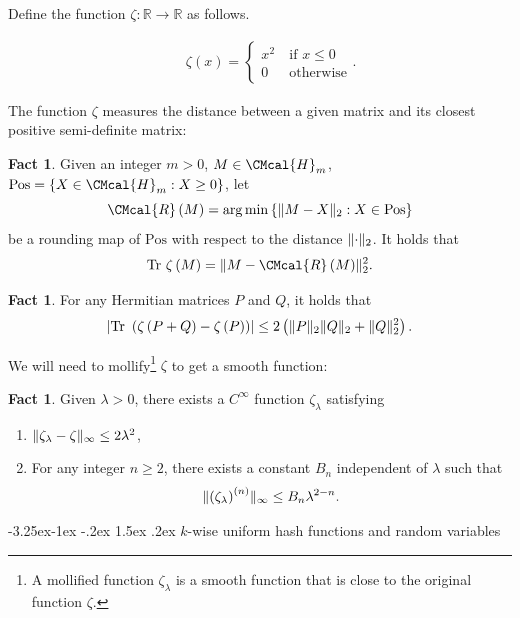 \documentclass[11pt]{article}
\makeatletter
\renewcommand{\subsection}{\@startsection{subsection}{2}{\z@}%
             {-3.25ex\@plus -1ex \@minus -.2ex}%
             {1.5ex \@plus .2ex}%
             {\normalfont\large\scshape\bfseries}}
\def\H{\CMcal{H}}
\def\R{\CMcal{R}}
\theoremstyle{plain}
\theoremstyle{definition}
\newtheorem{fact}[theorem]{Fact}
\newcommand{\reals}{{\mathbb R}}
\newcommand {\set} [1] {\ensuremath{ \left\lbrace #1 \right\rbrace }}
\newcommand {\br} [1] {\ensuremath{ \left( #1 \right) }}
\DeclarePairedDelimiter{\norm}{\lVert}{\rVert}
\newcommand {\normsub} [2] {\ensuremath{ \norm{#1}_{#2} }}
\newcommand {\twonorm} [1] {\normsub{#1}{2}}
\DeclarePairedDelimiter{\abs}{\lvert}{\rvert}
\newcommand {\Tr} {\ensuremath{ \mathrm{Tr} }}
\newcommand{\1}{\mathbb{1}} %
\makeatother
\begin{document}
Define the function $\zeta:\reals\rightarrow\reals$ as follows.

\begin{eqnarray}
	&&\zeta\br{x}=\begin{cases}x^2~&\mbox{if $x\leq 0$}\\ 0~&\mbox{otherwise}\end{cases}.\label{eqn:zeta}
\end{eqnarray}

The function $\zeta$ measures the distance between a given matrix and its closest positive semi-definite matrix:
\begin{fact}\label{lem:closedelta1}\cite[Lemma 9.1]{qin2021nonlocal}
	Given an integer $m>0$, $M\in\H_m$, $\mathrm{Pos}=\set{X\in\H_m:X\geq0}$, let \[\R\br{M}=\arg\min\set{\twonorm{M-X}:X\in\mathrm{Pos}}\]
	 be a rounding map of $\mathrm{Pos}$ with respect to the distance $\twonorm{\cdot}$. It holds that
	\[\Tr~\zeta\br{M}=\twonorm{M-\R\br{M}}^2.\]
\end{fact}

\begin{fact}\label{lem:zetaadditivity}\cite[Lemma 10.4]{qin2021nonlocal}
	For any Hermitian matrices $P$ and $Q$, it holds that \[\abs{\Tr~\br{\zeta\br{P+Q}-\zeta\br{P}}}\leq2\br{\twonorm{P}\twonorm{Q}+\twonorm{Q}^2}.\]
\end{fact}

We will need to mollify\footnote{A mollified function $\zeta_\lambda$ is a smooth function that is close to the original function $\zeta$.}  $\zeta$ to get a smooth function:
\begin{fact}\label{fac:zetalambda}\cite[Lemma 3.21]{mossel2005noise}
Given $\lambda>0$, there exists a $C^\infty$ function $\zeta_\lambda$ satisfying
\begin{enumerate}
\item $\norm{\zeta_\lambda-\zeta}_\infty\leq2\lambda^2$,
\item For any integer $n\geq2$, there exists a constant $B_n$ independent of $\lambda$ such that \[\norm{\br{\zeta_\lambda}^{(n)}}_\infty\leq B_n\lambda^{2-n}.\]
\end{enumerate}
\end{fact}





\subsection{\texorpdfstring{$k$}{k}-wise uniform hash functions and random variables}\label{sec:k-uniform}
\end{document}
